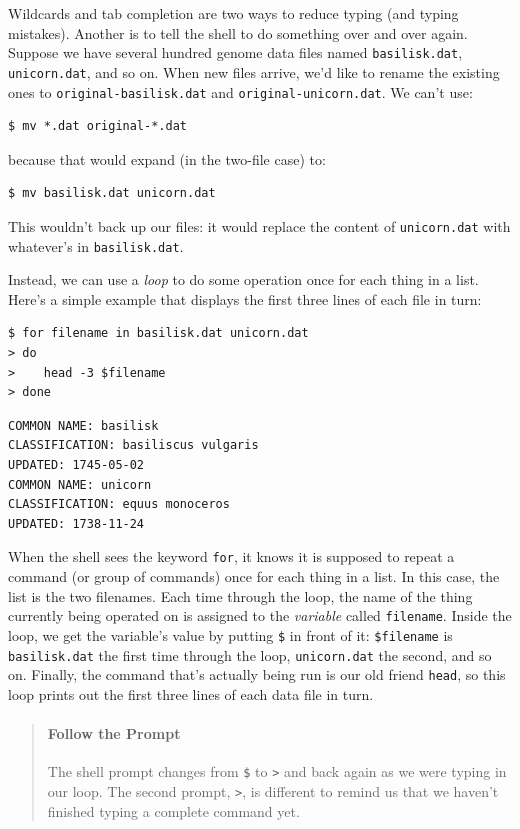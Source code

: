 \documentclass[]{book}
\newcommand{\gdef}[2]{\emph{#2}}
\begin{document}
Wildcards and tab completion are two ways to reduce typing (and typing
mistakes). Another is to tell the shell to do something over and over
again. Suppose we have several hundred genome data files named
\texttt{basilisk.dat}, \texttt{unicorn.dat}, and so on. When new files
arrive, we'd like to rename the existing ones to
\texttt{original-basilisk.dat} and \texttt{original-unicorn.dat}. We
can't use:

\begin{verbatim}
$ mv *.dat original-*.dat
\end{verbatim}

because that would expand (in the two-file case) to:

\begin{verbatim}
$ mv basilisk.dat unicorn.dat
\end{verbatim}

This wouldn't back up our files: it would replace the content of
\texttt{unicorn.dat} with whatever's in \texttt{basilisk.dat}.

Instead, we can use a \gdef{g:for-loop}{loop} to do some operation
once for each thing in a list. Here's a simple example that displays the
first three lines of each file in turn:

\begin{verbatim}
$ for filename in basilisk.dat unicorn.dat
> do
>    head -3 $filename
> done
\end{verbatim}

\begin{verbatim}
COMMON NAME: basilisk
CLASSIFICATION: basiliscus vulgaris
UPDATED: 1745-05-02
COMMON NAME: unicorn
CLASSIFICATION: equus monoceros
UPDATED: 1738-11-24
\end{verbatim}

When the shell sees the keyword \texttt{for}, it knows it is supposed to
repeat a command (or group of commands) once for each thing in a list.
In this case, the list is the two filenames. Each time through the loop,
the name of the thing currently being operated on is assigned to the
\gdef{g:variable}{variable} called \texttt{filename}. Inside the
loop, we get the variable's value by putting \texttt{\$} in front of it:
\texttt{\$filename} is \texttt{basilisk.dat} the first time through the
loop, \texttt{unicorn.dat} the second, and so on. Finally, the command
that's actually being run is our old friend \texttt{head}, so this loop
prints out the first three lines of each data file in turn.

\begin{quote}
\mbox{}\paragraph{Follow the Prompt}

The shell prompt changes from \texttt{\$} to \texttt{\textgreater{}} and
back again as we were typing in our loop. The second prompt,
\texttt{\textgreater{}}, is different to remind us that we haven't
finished typing a complete command yet.
\end{quote}
\end{document}
